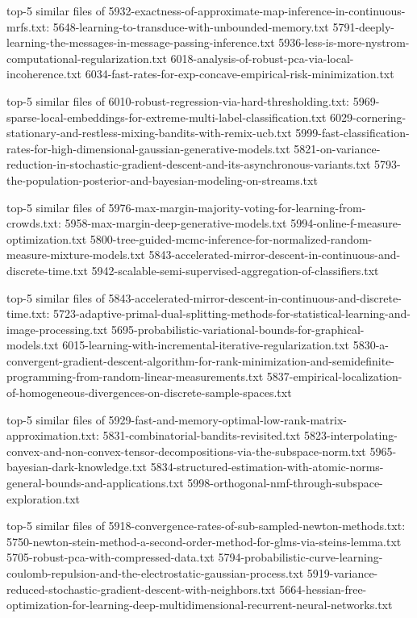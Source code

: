 \documentclass[11pt]{article}
\begin{document}
top-5 similar files of
5932-exactness-of-approximate-map-inference-in-continuous-mrfs.txt:
5648-learning-to-transduce-with-unbounded-memory.txt
5791-deeply-learning-the-messages-in-message-passing-inference.txt
5936-less-is-more-nystrom-computational-regularization.txt
6018-analysis-of-robust-pca-via-local-incoherence.txt
6034-fast-rates-for-exp-concave-empirical-risk-minimization.txt

top-5 similar files of 6010-robust-regression-via-hard-thresholding.txt:
5969-sparse-local-embeddings-for-extreme-multi-label-classification.txt
6029-cornering-stationary-and-restless-mixing-bandits-with-remix-ucb.txt
5999-fast-classification-rates-for-high-dimensional-gaussian-generative-models.txt
5821-on-variance-reduction-in-stochastic-gradient-descent-and-its-asynchronous-variants.txt
5793-the-population-posterior-and-bayesian-modeling-on-streams.txt

top-5 similar files of
5976-max-margin-majority-voting-for-learning-from-crowds.txt:
5958-max-margin-deep-generative-models.txt
5994-online-f-measure-optimization.txt
5800-tree-guided-mcmc-inference-for-normalized-random-measure-mixture-models.txt
5843-accelerated-mirror-descent-in-continuous-and-discrete-time.txt
5942-scalable-semi-supervised-aggregation-of-classifiers.txt

top-5 similar files of
5843-accelerated-mirror-descent-in-continuous-and-discrete-time.txt:
5723-adaptive-primal-dual-splitting-methods-for-statistical-learning-and-image-processing.txt
5695-probabilistic-variational-bounds-for-graphical-models.txt
6015-learning-with-incremental-iterative-regularization.txt
5830-a-convergent-gradient-descent-algorithm-for-rank-minimization-and-semidefinite-programming-from-random-linear-measurements.txt
5837-empirical-localization-of-homogeneous-divergences-on-discrete-sample-spaces.txt

top-5 similar files of
5929-fast-and-memory-optimal-low-rank-matrix-approximation.txt:
5831-combinatorial-bandits-revisited.txt
5823-interpolating-convex-and-non-convex-tensor-decompositions-via-the-subspace-norm.txt
5965-bayesian-dark-knowledge.txt
5834-structured-estimation-with-atomic-norms-general-bounds-and-applications.txt
5998-orthogonal-nmf-through-subspace-exploration.txt

top-5 similar files of
5918-convergence-rates-of-sub-sampled-newton-methods.txt:
5750-newton-stein-method-a-second-order-method-for-glms-via-steins-lemma.txt
5705-robust-pca-with-compressed-data.txt
5794-probabilistic-curve-learning-coulomb-repulsion-and-the-electrostatic-gaussian-process.txt
5919-variance-reduced-stochastic-gradient-descent-with-neighbors.txt
5664-hessian-free-optimization-for-learning-deep-multidimensional-recurrent-neural-networks.txt
\end{document}
